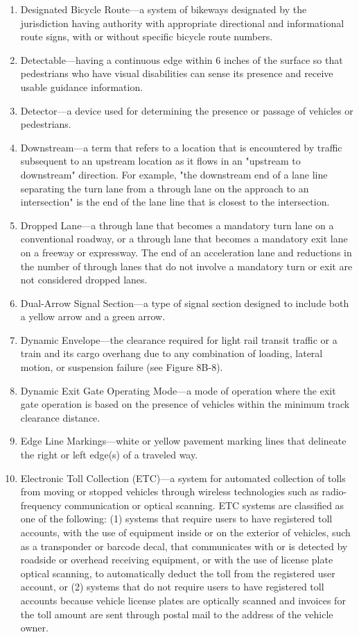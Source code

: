 \documentclass[9pt]{memoir}
\begin{document}
{\begin{enumerate}[label=\arabic*., ref=\arabic*]
\item Designated Bicycle Route---a system of bikeways designated by the jurisdiction having authority with appropriate directional and informational route signs, with or without specific bicycle route numbers.
\item Detectable---having a continuous edge within 6 inches of the surface so that pedestrians who have visual disabilities can sense its presence and receive usable guidance information.
\item Detector---a device used for determining the presence or passage of vehicles or pedestrians.
\item Downstream---a term that refers to a location that is encountered by traffic subsequent to an upstream location as it flows in an "upstream to downstream" direction. For example, "the downstream end of a lane line separating the turn lane from a through lane on the approach to an intersection" is the end of the lane line that is closest to the intersection.
\item Dropped Lane---a through lane that becomes a mandatory turn lane on a conventional roadway, or a through lane that becomes a mandatory exit lane on a freeway or expressway. The end of an acceleration lane and reductions in the number of through lanes that do not involve a mandatory turn or exit are not considered dropped lanes.
\item Dual-Arrow Signal Section---a type of signal section designed to include both a yellow arrow and a green arrow.
\item Dynamic Envelope---the clearance required for light rail transit traffic or a train and its cargo overhang due to any combination of loading, lateral motion, or suspension failure (see Figure 8B-8).
\item Dynamic Exit Gate Operating Mode---a mode of operation where the exit gate operation is based on the presence of vehicles within the minimum track clearance distance.
\item Edge Line Markings---white or yellow pavement marking lines that delineate the right or left edge(s) of a traveled way.
\item Electronic Toll Collection (ETC)---a system for automated collection of tolls from moving or stopped vehicles through wireless technologies such as radio-frequency communication or optical scanning.  ETC systems are classified as one of the following: (1) systems that require users to have registered toll accounts, with the use of equipment inside or on the exterior of vehicles, such as a transponder or barcode decal, that communicates with or is detected by roadside or overhead receiving equipment, or with the use of license plate optical scanning, to automatically deduct the toll from the registered user account, or (2) systems that do not require users to have registered toll accounts because vehicle license plates are optically scanned and invoices for the toll amount are sent through postal mail to the address of the vehicle owner.

\end{enumerate}}
\end{document}
